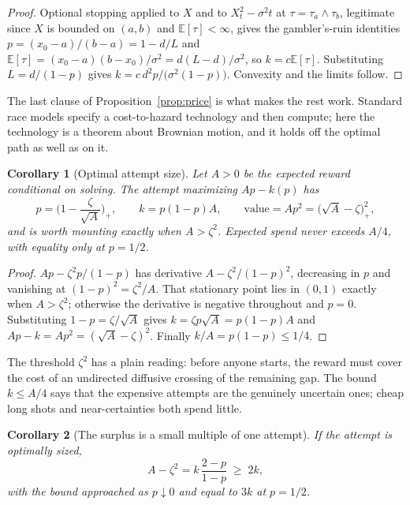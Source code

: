 \documentclass[11pt]{article}
\theoremstyle{itheads}
\newtheorem{corollary}{Corollary}
\newcommand{\E}{\mathbb{E}}
\begin{document}
\begin{proof}
Optional stopping applied to $X$ and to $X_{t}^{2}-\sigma^{2}t$ at
$\tau=\tau_{a}\wedge\tau_{b}$, legitimate since $X$ is bounded on $(a,b)$
and $\E[\tau]<\infty$, gives the gambler's-ruin identities
$p=(x_{0}-a)/(b-a)=1-d/L$ and
$\E[\tau]=(x_{0}-a)(b-x_{0})/\sigma^{2}=d(L-d)/\sigma^{2}$, so
$k=c\E[\tau]$. Substituting $L=d/(1-p)$ gives
$k=c\,d^{2}p/\big(\sigma^{2}(1-p)\big)$. Convexity and the limits follow.
\end{proof}

The last clause of Proposition~\ref{prop:price} is what makes the rest
work. Standard race models specify a cost-to-hazard technology and then
compute; here the technology is a theorem about Brownian motion, and it
holds off the optimal path as well as on it.

\begin{corollary}[Optimal attempt size]\label{cor:size}
Let $A>0$ be the expected reward conditional on solving. The attempt
maximizing $Ap-k(p)$ has
\begin{equation}
p=\Big(1-\frac{\zeta}{\sqrt A}\Big)_{+},
\qquad
k=p(1-p)A,
\qquad
\text{value}=Ap^{2}=\big(\sqrt A-\zeta\big)_{+}^{2},
\label{eq:size}
\end{equation}
and is worth mounting exactly when $A>\zeta^{2}$. Expected spend never
exceeds $A/4$, with equality only at $p=1/2$.
\end{corollary}

\begin{proof}
$Ap-\zeta^{2}p/(1-p)$ has derivative $A-\zeta^{2}/(1-p)^{2}$, decreasing
in $p$ and vanishing at $(1-p)^{2}=\zeta^{2}/A$. That stationary point
lies in $(0,1)$ exactly when $A>\zeta^{2}$; otherwise the derivative is
negative throughout and $p=0$. Substituting $1-p=\zeta/\sqrt A$ gives
$k=\zeta p\sqrt A=p(1-p)A$ and $Ap-k=Ap^{2}=(\sqrt A-\zeta)^{2}$. Finally
$k/A=p(1-p)\le1/4$.
\end{proof}

The threshold $\zeta^{2}$ has a plain reading: before anyone starts, the
reward must cover the cost of an undirected diffusive crossing of the
remaining gap. The bound $k\le A/4$ says that the expensive attempts are
the genuinely uncertain ones; cheap long shots and near-certainties both
spend little.

\begin{corollary}[The surplus is a small multiple of one attempt]
\label{cor:surplus}
If the attempt is optimally sized,
\begin{equation}
A-\zeta^{2}=k\,\frac{2-p}{1-p}\;\ge\;2k,
\label{eq:surplus}
\end{equation}
with the bound approached as $p\downarrow0$ and equal to $3k$ at
$p=1/2$.
\end{corollary}
\end{document}
